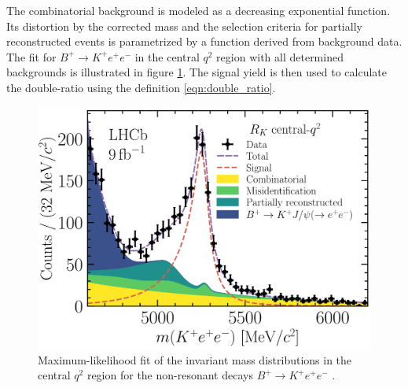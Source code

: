 The combinatorial background is modeled as a decreasing exponential function.
Its distortion by the corrected mass and the selection criteria for partially 
reconstructed events is parametrized by a function derived from background data.
The fit for $B^+\to K^+e^+e^-$ in the central $q^2$ region with all determined 
backgrounds is illustrated in figure \ref{fig:fits}.
The signal yield is then used to calculate the double-ratio using the definition
\eqref{eqn:double_ratio}.
\begin{figure}
    \centering
    \includegraphics[width=0.85\linewidth]{figures/fits_3.png}
    \caption{Maximum-likelihood fit of the invariant mass distributions in the central $q^2$ region for the non-resonant decays $B^+\to K^+e^+e^-$ \cite{lhcbcollaboration2022test}.}
    \label{fig:fits}
\end{figure}

